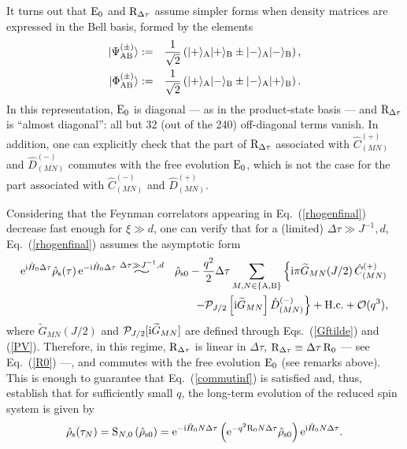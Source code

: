 \documentclass[]{nature}
\newcommand{\widesim}[2][1.5]{
  \mathrel{\overset{#2}{\scalebox{#1}[1]{$\sim$}}}
}
\begin{document}
{It turns out that ${\rm E}_0$ and  ${\rm R}_{\Delta\tau}$ assume simpler forms when density matrices are 
expressed in the  Bell basis, formed by the
elements
\begin{eqnarray}
|\Psi_{\rm AB}^{(\pm)}\rangle &:=& \frac{1}{\sqrt{2}}\left(|+\rangle_{\rm A}|+\rangle_{\rm B}\pm |-\rangle_{\rm A}|-\rangle_{\rm B} \right),
\label{Bellbasis1}
\\
|\Phi_{\rm AB}^{(\pm)}\rangle &:=& \frac{1}{\sqrt{2}}\left(|+\rangle_{\rm A}|-\rangle_{\rm B}\pm |-\rangle_{\rm A}|+\rangle_{\rm B} \right).
\label{Bellbasis2}
\end{eqnarray}
In this representation, ${\rm E}_0$ is diagonal --- as in the product-state basis --- and ${\rm R}_{\Delta \tau}$ is ``almost diagonal'': all but 32  (out of the
240) off-diagonal terms vanish. 
In addition, 
one can explicitly check that 
the part of ${\rm R}_{\Delta\tau}$ associated with $\hat C^{(+)}_{(MN)}$ and $\hat D^{(-)}_{(MN)}$
 commutes with the free evolution ${\rm E}_0$, which is not the case for the part associated with $\hat C^{(-)}_{(MN)}$ and $\hat D^{(+)}_{(MN)}$.

Considering that the Feynman correlators appearing in Eq.~(\ref{rhogenfinal}) decrease fast enough for
$\xi \gg d$, one can verify that for a (limited) $\Delta \tau \gg J^{-1},d$, Eq.~(\ref{rhogenfinal}) assumes the asymptotic form
\begin{eqnarray}
{\rm e}^{{\rm i}\hat H_0 \Delta \tau}\hat \rho_{\rm s}(\tau)\,{\rm e}^{-{\rm i}\hat H_0 \Delta \tau}  &
\widesim[2]{\Delta\tau\gg J^{-1},d}
& 
 \hat \rho_{\rm s0}
-\frac{q^2}{2}\Delta \tau
\sum_{
{M,N\in\{{\rm A},{\rm B}\}}}
 \left\{ {\rm i} \pi\widetilde{G}_{MN}(J/2)\, \hat C^{(+)}_{(MN)} \right.
 \nonumber \\
 & &\left.-{\cal P}_{J/2}\left[{\rm i}\widetilde{G}_{MN}\right]\hat D^{(-)}_{(MN)} 
\right\}
+{\rm H.c.}
 + {\cal O} (q^3),
 \label{rhotilde}
\end{eqnarray}
where $\widetilde{G}_{MN}(J/2)$ and ${\cal P}_{J/2}[{\rm i}\widetilde{G}_{MN}]$ are defined through Eqs.~(\ref{Gftilde}) and (\ref{PV}).
Therefore, in this regime, ${\rm R}_{\Delta\tau}$ is linear in $\Delta \tau$, ${\rm R}_{\Delta\tau} \equiv  \Delta \tau\, {\rm R}_0$
--- see Eq.~(\ref{R0}) ---, and
commutes with the free evolution ${\rm E}_0$ (see remarks above). This is enough to guarantee that Eq.~(\ref{commutinf}) is satisfied and, thus, 
establish that for sufficiently small $q$, the long-term evolution of the reduced spin system is given by
\begin{eqnarray}
\hat\rho_{\rm s}(\tau_N) = {\rm S}_{N,0}\left(\hat\rho_{\rm s0}\right)
= {\rm e}^{-{\rm i} \hat H_0 N \Delta\tau}\left({\rm e}^{-q^2{\rm R}_0 N\Delta \tau}\hat\rho_{\rm s0}\right){\rm e}^{{\rm i} \hat H_0 N\Delta\tau}.
\label{evolfinal}
\end{eqnarray}



}
\end{document}
